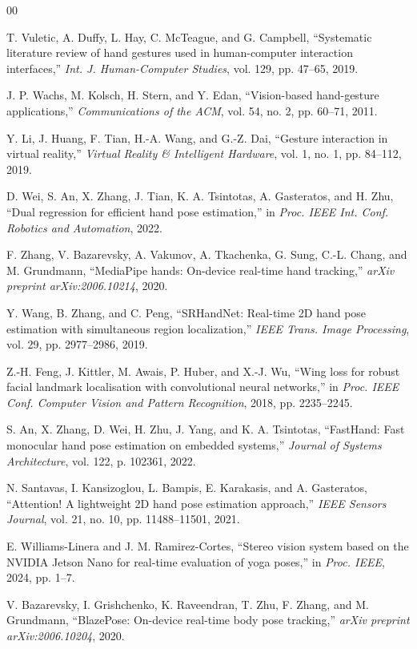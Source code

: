 \documentclass[10pt,letterpaper]{article}
\begin{document}
\clearpage
\begin{thebibliography}{00}

T. Vuletic, A. Duffy, L. Hay, C. McTeague, and G. Campbell, ``Systematic literature review of hand gestures used in human-computer interaction interfaces,'' \emph{Int. J. Human-Computer Studies}, vol. 129, pp. 47--65, 2019.

J. P. Wachs, M. Kolsch, H. Stern, and Y. Edan, ``Vision-based hand-gesture applications,'' \emph{Communications of the ACM}, vol. 54, no. 2, pp. 60--71, 2011.

Y. Li, J. Huang, F. Tian, H.-A. Wang, and G.-Z. Dai, ``Gesture interaction in virtual reality,'' \emph{Virtual Reality \& Intelligent Hardware}, vol. 1, no. 1, pp. 84--112, 2019.

D. Wei, S. An, X. Zhang, J. Tian, K. A. Tsintotas, A. Gasteratos, and H. Zhu, ``Dual regression for efficient hand pose estimation,'' in \emph{Proc. IEEE Int. Conf. Robotics and Automation}, 2022.

F. Zhang, V. Bazarevsky, A. Vakunov, A. Tkachenka, G. Sung, C.-L. Chang, and M. Grundmann, ``MediaPipe hands: On-device real-time hand tracking,'' \emph{arXiv preprint arXiv:2006.10214}, 2020.

Y. Wang, B. Zhang, and C. Peng, ``SRHandNet: Real-time 2D hand pose estimation with simultaneous region localization,'' \emph{IEEE Trans. Image Processing}, vol. 29, pp. 2977--2986, 2019.

Z.-H. Feng, J. Kittler, M. Awais, P. Huber, and X.-J. Wu, ``Wing loss for robust facial landmark localisation with convolutional neural networks,'' in \emph{Proc. IEEE Conf. Computer Vision and Pattern Recognition}, 2018, pp. 2235--2245.

S. An, X. Zhang, D. Wei, H. Zhu, J. Yang, and K. A. Tsintotas, ``FastHand: Fast monocular hand pose estimation on embedded systems,'' \emph{Journal of Systems Architecture}, vol. 122, p. 102361, 2022.

N. Santavas, I. Kansizoglou, L. Bampis, E. Karakasis, and A. Gasteratos, ``Attention! A lightweight 2D hand pose estimation approach,'' \emph{IEEE Sensors Journal}, vol. 21, no. 10, pp. 11488--11501, 2021.

E. Williams-Linera and J. M. Ramirez-Cortes, ``Stereo vision system based on the NVIDIA Jetson Nano for real-time evaluation of yoga poses,'' in \emph{Proc. IEEE}, 2024, pp. 1--7.

V. Bazarevsky, I. Grishchenko, K. Raveendran, T. Zhu, F. Zhang, and M. Grundmann, ``BlazePose: On-device real-time body pose tracking,'' \emph{arXiv preprint arXiv:2006.10204}, 2020.

\end{thebibliography}
\end{document}
